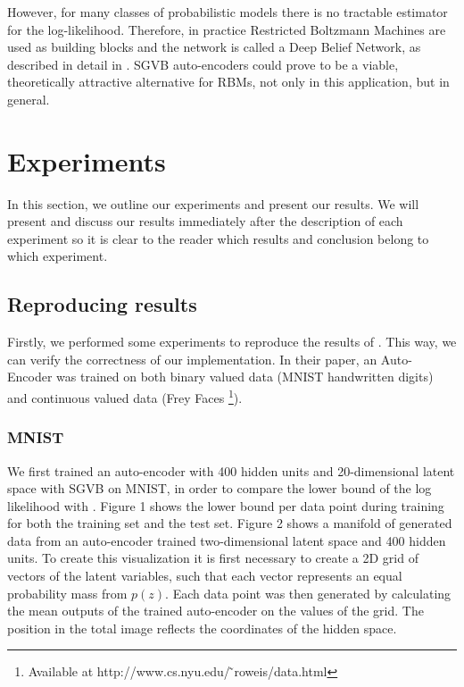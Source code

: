 \documentclass{article}
\begin{document}
However, for many classes of probabilistic models there is no tractable estimator for the log-likelihood. Therefore, in practice Restricted Boltzmann Machines are used as building blocks and the network is called a Deep Belief Network, as described in detail in \cite{hinton2006reducing}. SGVB auto-encoders could prove to be a viable, theoretically attractive alternative for RBMs, not only in this application, but in general.

\section{Experiments}

In this section, we outline our experiments and present our results. We will present and discuss our results immediately after the description of each experiment so it is clear to the reader which results and conclusion belong to which experiment.

\subsection{Reproducing results}

Firstly, we performed some experiments to reproduce the results of \cite{kingma2013auto}. This way, we can verify the correctness of our implementation. In their paper, an Auto-Encoder was trained on both binary valued data (MNIST handwritten digits) and continuous valued data (Frey Faces \footnote{Available at http://www.cs.nyu.edu/ ̃roweis/data.html}).

\subsubsection{MNIST}

We first trained an auto-encoder with 400 hidden units and 20-dimensional latent space with SGVB on MNIST, in order to compare the lower bound of the log likelihood with \cite{kingma2013auto}. Figure 1 shows the lower bound per data point during training for both the training set and the test set. Figure 2 shows a manifold of generated data from an auto-encoder trained two-dimensional latent space and 400 hidden units. To create this visualization it is first necessary to create a 2D grid of vectors of the latent variables, such that each vector represents an equal probability mass from $p(z)$. Each data point was then generated by calculating the mean outputs of the trained auto-encoder on the values of the grid. The position in the total image reflects the coordinates of the hidden space. \\ 
\end{document}
